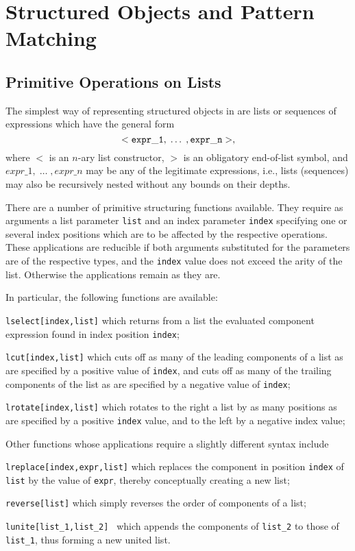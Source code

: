 \section{Structured Objects and Pattern Matching}
\subsection{Primitive Operations on Lists}
The simplest way of representing structured objects in \kir are {\mys lists} or {\mys sequences}
of expressions which have the general form
$$
{\tt <expr\_1,\;\ldots\;,expr\_n>},
$$
where $<$ is an $n$-ary {\mys list constructor}, $>$ is an obligatory {\mys end-of-list symbol},
and $expr\_1,\;\ldots\;,expr\_n$ may be any of the legitimate \kir expressions, i.e.,
lists (sequences) may also be recursively nested without any bounds on their depths.

There are a number of primitive {\mys structuring functions} available. They
require as arguments a list parameter {\tt list} and an index parameter {\tt index} 
specifying one or several index positions
which are to be affected by the respective operations. 
These applications are reducible if both arguments substituted for the parameters 
are of the respective types, and the
{\tt index} value does not exceed the arity of the list. Otherwise the applications remain as
they are.

In particular, the following functions are available:
\begin{description}
\item{\tt lselect[index,list]} which returns from a list the evaluated component
expression found in index position {\tt index};
\item{\tt lcut[index,list]} which cuts off as many of the leading components of a list as are
specified by a positive value of {\tt index}, and cuts off as many of the trailing components
of the list as are specified by a negative value of {\tt index};
\item{\tt lrotate[index,list]} which rotates to the right a list by as many positions as are
 specified by a positive {\tt index} value, and to the left by a negative index value;
\end{description}

Other functions whose applications require a slightly different syntax include
\begin{description}
\item {\tt lreplace[index,expr,list]} which replaces the component in position {\tt index}
of {\tt list} by the value of {\tt expr}, thereby conceptually creating a new list;
\item{\tt reverse[list]} which simply reverses the order of components of a list;
\item{\tt lunite[list\_1,list\_2] } which appends the components of {\tt list\_2}
to those of {\tt list\_1}, thus forming a new united list.
\end{description}

